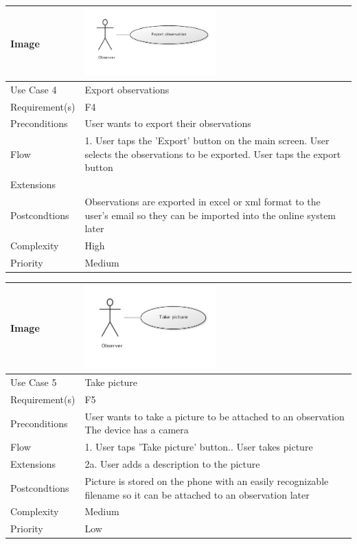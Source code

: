 \begin{tabular}[t]{|l|p{}|}\hline
	Image&\includegraphics[width=0.5\textwidth]{reqspec/uc/export.png} \\\hline
	Use Case 4&Export  observations\\\hline
	Requirement(s)&F4\\\hline
	Preconditions& User wants to export their observations \\\hline
	Flow&1. User taps the 'Export' button on the main screen\newline
	2. User selects the observations to be exported\newline
	3. User taps the export button\\\hline
	Extensions& \\\hline
	Postcondtions&Observations are exported in excel or xml format to the user's email so they can be imported into the online system later\\\hline
	Complexity&High\\\hline
	Priority&Medium\\\hline
\end{tabular}

\hspace{2em}


\begin{tabular}[t]{|l|p{}|}\hline
	Image&\includegraphics[width=0.5\textwidth]{reqspec/uc/takepicture.png} \\\hline
	Use Case 5&Take picture\\\hline
	Requirement(s)&F5\\\hline
	Preconditions&User wants to take a picture to be attached to an observation\newline
	The device has a camera\\\hline
	Flow&1. User taps 'Take picture' button.\newline
	2. User takes picture \\\hline
	Extensions& 2a. User adds a description to the picture\\\hline
	Postcondtions&Picture is stored on the phone with an easily recognizable filename so it can be attached to an observation 	later\\\hline
	Complexity&Medium\\\hline
	Priority&Low\\\hline
\end{tabular}
	
